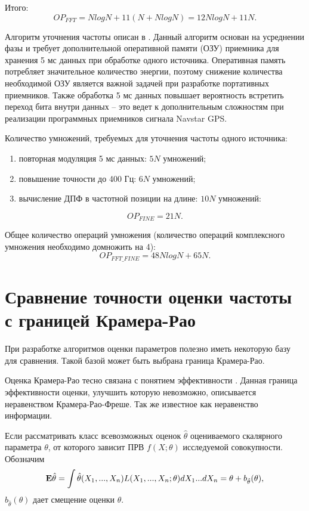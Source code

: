 Итого:
\begin{equation}
	\label{eq:op_fft}
	OP_{FFT} = NlogN + 11(N + NlogN) = 12NlogN + 11N.
\end{equation}

Алгоритм уточнения частоты описан в \cite{tsui}. Данный алгоритм основан на усреднении фазы и требует дополнительной оперативной памяти (ОЗУ) приемника для
хранения 5 мс данных при обработке одного источника. Оперативная память потребляет значительное количество энергии, поэтому снижение количества
необходимой ОЗУ является важной задачей при разработке портативных приемников. Также обработка 5 мс данных повышает вероятность встретить переход бита
внутри данных – это ведет к дополнительным сложностям при реализации программных приемников сигнала Navstar GPS.

Количество умножений, требуемых для уточнения частоты одного источника:
\begin{enumerate}
\item повторная модуляция 5 мс данных: ${5N}$ умножений;
\item повышение точности до 400 Гц: ${6N}$ умножений;
\item вычисление ДПФ в частотной позиции на длине: ${10N}$ умножений:
\end{enumerate}
\begin{equation}
	\label{eq:op_fine}
	OP_{FINE} = 21N.
\end{equation}

Общее количество операций умножения (количество операций комплексного умножения необходимо домножить на 4):
\begin{equation}
	\label{eq:op_fine_fft}
	OP_{FFT\_FINE} = 48NlogN + 65N.
\end{equation}

\section{Сравнение точности оценки частоты с границей Крамера-Рао}
При разработке алгоритмов оценки параметров полезно иметь некоторую базу для сравнения. Такой базой может быть выбрана граница Крамера-Рао.

Оценка Крамера-Рао тесно связана с понятием эффективности . Данная граница эффективности оценки, улучшить которую невозможно, описывается
неравенством Крамера-Рао-Фреше. Так же известное как неравенство информации.

Если рассматривать класс всевозможных оценок ${\hat{\theta}}$ оцениваемого скалярного параметра ${\theta}$, от которого зависит ПРВ ${f(X; \theta)}$
исследуемой совокупности. Обозначим
\begin{equation}
	\label{eq:clrb_mean}
	{\bf{E}} \hat{\theta} = \int \hat{\theta} (X_1, ..., X_n)L(X_1, ..., X_n; \theta) dX_1 ... dX_n= \theta + b_{\hat{\theta}}(\theta),
\end{equation}
${b_{\hat{\theta}}(\theta)}$ дает смещение оценки ${\theta}$.

